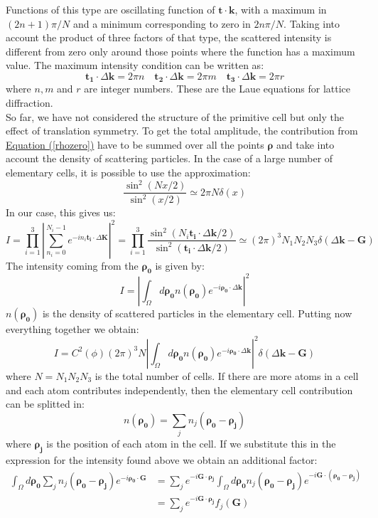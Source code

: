 \documentclass[10.75pt,a4paper,openright,bottom=2cm]{article}
\renewcommand{\Vec}[1]{\boldsymbol{#1}}
\begin{document}
Functions of this type are oscillating function of $\Vec{t}\cdot\Vec{k}$, with a maximum in $(2n+1)\pi/N$ and a minimum corresponding to zero in $2n\pi/N$. Taking into account the product of three factors of that type, the scattered intensity is different from zero only around those points where the function has a maximum value. The maximum intensity condition can be written as:
\[
\Vec{t_1}\cdot\Delta\Vec{k}=2\pi n \quad \Vec{t_2}\cdot\Delta\Vec{k}=2\pi m \quad \Vec{t_3}\cdot\Delta\Vec{k}=2\pi r
\]
where $n,m$ and $r$ are integer numbers. These are the Laue equations for lattice diffraction.\\
So far, we have not considered the structure of the primitive cell but only the effect of translation symmetry. To get the total amplitude, the contribution from \hyperref[rhozero]{Equation (\ref{rhozero})} have to be summed over all the points $\Vec{\rho}$ and take into account the density of scattering particles. In the case of a large number of elementary cells, it is possible to use the approximation:
\[
\frac{\sin^2(Nx/2)}{\sin^2(x/2)}\simeq2\pi N\delta(x)
\]
In our case, this gives us:
\[
I=\prod_{i=1}^3\left|\sum_{n_i=0}^{N_i-1}e^{-in_i\Vec{t_i}\cdot\Delta\Vec{K}}\right|^2=\prod_{i=1}^3\frac{\sin^2(N_i\Vec{t_i}\cdot\Delta\Vec{k}/2)}{\sin^2(\Vec{t_i}\cdot\Delta\Vec{k}/2)}\simeq(2\pi)^3N_1N_2N_3\delta(\Delta\Vec{k}-\Vec{G})
\]
The intensity coming from the $\Vec{\rho_0}$ is given by:
\[
I=\left|\int_\Omega d\Vec{\rho_0}n(\Vec{\rho_0})e^{-i\Vec{\rho_0}\cdot\Delta\Vec{k}}\right|^2
\]
$n(\Vec{\rho_0})$ is the density of scattered particles in the elementary cell. Putting now everything together we obtain:
\[
I=C^2(\phi)(2\pi)^3N\left|\int_\Omega d\Vec{\rho_0}n(\Vec{\rho_0})e^{-i\Vec{\rho_0}\cdot\Delta\Vec{k}}\right|^2\delta(\Delta\Vec{k}-\Vec{G})
\]
where $N=N_1N_2N_3$ is the total number of cells. If there are more atoms in a cell and each atom contributes independently, then the elementary cell contribution can be splitted in:
\[
n(\Vec{\rho_0})=\sum_jn_j(\Vec{\rho_0}-\Vec{\rho_j})
\]
where $\Vec{\rho_j}$ is the position of each atom in the cell. If we substitute this in the expression for the intensity found above we obtain an additional factor:
\begin{align*}
\int_\Omega d\Vec{\rho_0}\sum_jn_j(\Vec{\rho_0}-\Vec{\rho_j})e^{-i\Vec{\rho_0}\cdot\Vec{G}}&=\sum_je^{-i\Vec{G}\cdot\Vec{\rho_j}}\int_\Omega d\Vec{\rho_0}n_j(\Vec{\rho_0}-\Vec{\rho_j})e^{-i\Vec{G}\cdot(\Vec{\rho_0}-\Vec{\rho_j})}\\
&=\sum_je^{-i\Vec{G}\cdot\Vec{\rho_j}}f_j(\Vec{G})
\end{align*}
\end{document}
